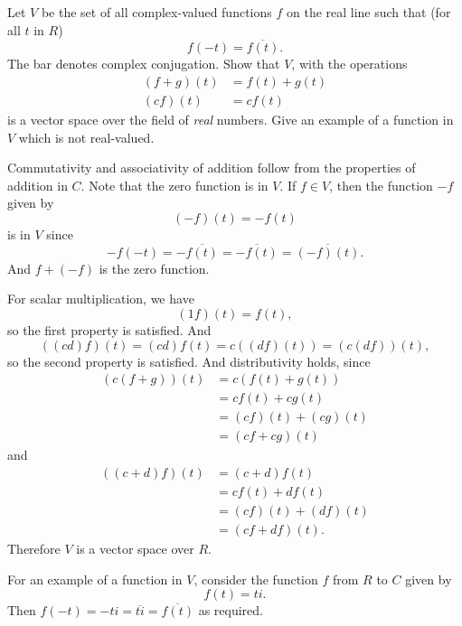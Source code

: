  Let $V$ be the set of all complex-valued functions $f$ on
the real line such that (for all $t$ in $R$)
\begin{equation*}
  f(-t) = \overline{f(t)}.
\end{equation*}
The bar denotes complex conjugation. Show that $V$, with the
operations
\begin{align*}
  (f + g)(t) &= f(t) + g(t) \\
  (cf)(t) &= cf(t)
\end{align*}
is a vector space over the field of {\em real} numbers. Give an
example of a function in $V$ which is not real-valued.
\begin{solution}
  Commutativity and associativity of addition follow from the
  properties of addition in $C$. Note that the zero function is in
  $V$. If $f\in V$, then the function $-f$ given by
  \begin{equation*}
    (-f)(t) = -f(t)
  \end{equation*}
  is in $V$ since
  \begin{equation*}
    -f(-t) = -\overline{f(t)}
    = \overline{-f(t)} = \overline{(-f)(t)}.
  \end{equation*}
  And $f + (-f)$ is the zero function.

  For scalar multiplication, we have
  \begin{equation*}
    (1f)(t) = f(t),
  \end{equation*}
  so the first property is satisfied. And
  \begin{equation*}
    ((cd)f)(t) = (cd)f(t) = c((df)(t)) = (c(df))(t),
  \end{equation*}
  so the second property is satisfied. And distributivity holds, since
  \begin{align*}
    (c(f + g))(t) &= c(f(t) + g(t)) \\
                  &= cf(t) + cg(t) \\
                  &= (cf)(t) + (cg)(t) \\
                  &= (cf + cg)(t)
  \end{align*}
  and
  \begin{align*}
    ((c + d)f)(t) &= (c + d)f(t) \\
                  &= cf(t) + df(t) \\
                  &= (cf)(t) + (df)(t) \\
                  &= (cf + df)(t).
  \end{align*}
  Therefore $V$ is a vector space over $R$.

  For an example of a function in $V$, consider the function $f$ from
  $R$ to $C$ given by
  \begin{equation*}
    f(t) = ti.
  \end{equation*}
  Then $f(-t) = -ti = \overline{ti} = \overline{f(t)}$ as required.
\end{solution}

